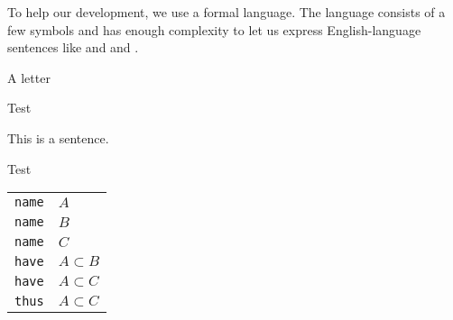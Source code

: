 To help our development, we use a formal language.
The language consists of a few symbols and has enough complexity to let us express English-language sentences like  and  and .



A letter

Test

This is a sentence.

\begin{construction}
  \normalfont
  Test

  \begin{tabular}{rl}
    \texttt{name} & $A$ \\
    \texttt{name} & $B$ \\
    \texttt{name} & $C$ \\
    \texttt{have} & $A \subset B$ \\
    \texttt{have} & $A \subset C$ \\
    \texttt{thus} & $ A \subset C$
  \end{tabular}
\end{construction}

%
%
%
%
%
%
%
%
\blankpage
